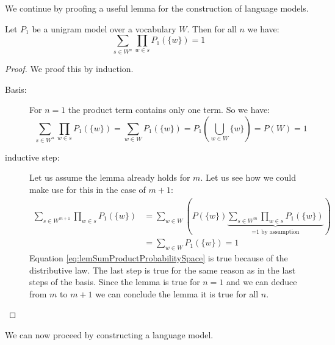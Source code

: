 \documentclass[•]{book}
\begin{document}
We continue by proofing a useful lemma for the construction of language models. 

\begin{lemma}\label{lem:sumProductProbabilitySpace}
Let $P_1$ be a unigram model over a vocabulary $W$. Then for all $n$ we have:
\[
\sum_{s\in W^n}\prod_{w\in s}P_1(\{w\}) =1
\]
\end{lemma}
\begin{proof}
We proof this by induction.
\begin{description}
\item[Basis:] For $n=1$ the product term contains only one term. So we have:
\[
\sum_{s\in W^n}\prod_{w\in s}P_1(\{w\}) = \sum_{w\in W}P_1(\{w\}) = P_1(\bigcup_{w\in W}\{w\}) = P(W) =  1
\]

\item[inductive step:] Let us assume the lemma already holds for $m$. Let us see how we could make use for this in the case of $m+1$:
\begin{align}
 \sum_{s\in W^{m+1}}\prod_{w\in s}P_1(\{w\}) & = \sum_{w\in W}\left(P(\{w\})\underbrace{ \sum_{s\in W^m}\prod_{w\in s}P_1(\{w\}) } _{\text{=1 by assumption}}\right) \label{eq:lemSumProductProbabilitySpace}  \\
 &= \sum_{w\in W}P_1(\{w\}) = 1
\end{align}
Equation \ref{eq:lemSumProductProbabilitySpace} is true because of the distributive law.
The last step is true for the same reason as in the last steps of the basis.
Since the lemma is true for $n=1$ and we can deduce from $m$ to $m+1$ we can conclude the lemma it is true for all $n$.
\end{description}
\end{proof}

We can now proceed by constructing a language model.
\end{document}
